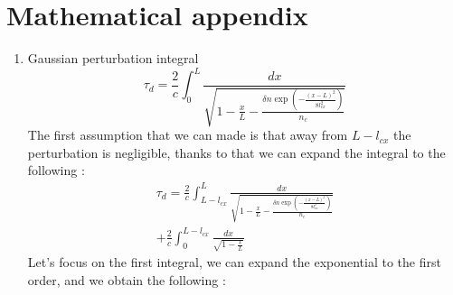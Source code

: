 \documentclass[11pt,a4paper]{report}
\begin{document}
\chapter{Mathematical appendix}
\begin{multicols*}{2}

    \begin{enumerate}
        \item Gaussian perturbation integral
              $$\tau_d = \frac{2}{c} \int_0^L \frac{dx}{\sqrt{1 - \frac{x}{L} - \frac{\delta n\exp(-\frac{(x - L)^2}{8l_{cx}^2})}{n_c}}}$$
              The first assumption that we can made is that away from $L - l_{cx}$ the perturbation is negligible, thanks to that we can expand the integral to the following :
              \begin{multline*}
                  \tau_d = \frac{2}{c} \int_{L - l_{cx}}^L \frac{dx}{\sqrt{1 - \frac{x}{L} - \frac{\delta n\exp(-\frac{(x - L)^2}{8l_{cx}^2})}{n_c}}} \\
                  + \frac{2}{c} \int_{0}^{L - l_{cx}} \frac{dx}{\sqrt{1 - \frac{x}{L}}}
              \end{multline*}
              Let's focus on the first integral, we can expand the exponential to the first order, and we obtain the following :


\end{enumerate}
\end{multicols*}
\end{document}
